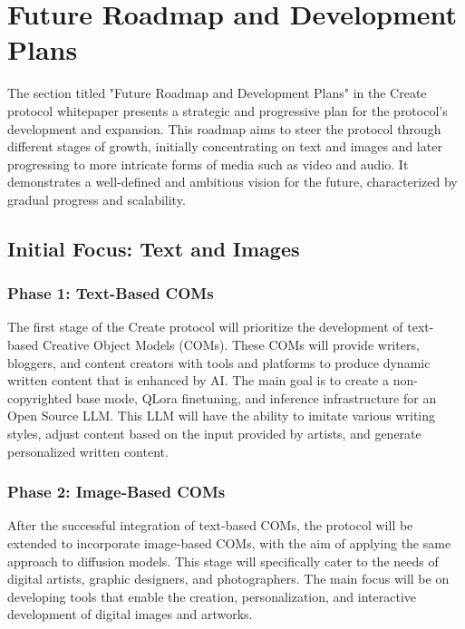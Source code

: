 \documentclass[12pt,a4paper]{article}
\begin{document}
\pagebreak

\section{Future Roadmap and Development Plans}

The section titled "Future Roadmap and Development Plans" in the Create protocol whitepaper presents a strategic and progressive plan for the protocol's development and expansion. This roadmap aims to steer the protocol through different stages of growth, initially concentrating on text and images and later progressing to more intricate forms of media such as video and audio. It demonstrates a well-defined and ambitious vision for the future, characterized by gradual progress and scalability.

\subsection{Initial Focus: Text and Images}

\subsubsection{Phase 1: Text-Based COMs}

The first stage of the Create protocol will prioritize the development of text-based Creative Object Models (COMs). These COMs will provide writers, bloggers, and content creators with tools and platforms to produce dynamic written content that is enhanced by AI. The main goal is to create a non-copyrighted base mode, QLora finetuning, and inference infrastructure for an Open Source LLM. This LLM will have the ability to imitate various writing styles, adjust content based on the input provided by artists, and generate personalized written content.

\subsubsection{Phase 2: Image-Based COMs}

After the successful integration of text-based COMs, the protocol will be extended to incorporate image-based COMs, with the aim of applying the same approach to diffusion models. This stage will specifically cater to the needs of digital artists, graphic designers, and photographers. The main focus will be on developing tools that enable the creation, personalization, and interactive development of digital images and artworks.
\end{document}

